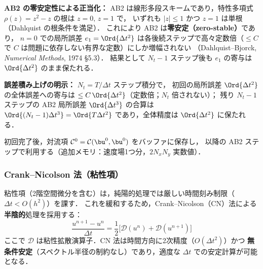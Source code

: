 \begin{tcolorbox}[warnbox, title={TVD-RK3 の適用範囲と全体時間精度}]
\noindent\textbf{AB2 の零安定性による正当化：}
AB2 は線形多段スキームであり，特性多項式 $\rho(z) = z^2 - z$ の根は $z=0,\,z=1$ で，
いずれも $|z| \leq 1$ かつ $z=1$ は単根（Dahlquist の根条件を満足）．
これにより AB2 は\textbf{零安定（zero-stable）}であり，
$n=0$ での局所誤差 $e_1 = \Ord{\Delta t^2}$ は各後続ステップで高々定数倍（$\leq C$ で $C$ は問題に依存しない有界な定数）にしか増幅されない
（Dahlquist--Bjorck, \textit{Numerical Methods}, 1974 §5.3）．
結果として $N_t - 1$ ステップ後も $e_1$ の寄与は $\Ord{\Delta t^2}$ のまま保たれる．

\noindent\textbf{誤差積み上げの明示：}
$N_t = T/\Delta t$ ステップ積分で，
初回の局所誤差 $\Ord{\Delta t^2}$ の全体誤差への寄与は $\leq C\,\Ord{\Delta t^2}$（定数倍；$N_t$ 倍されない）；
残り $N_t - 1$ ステップの AB2 局所誤差 $\Ord{\Delta t^3}$ の合算は
$\Ord{(N_t-1)\Delta t^3} = \Ord{T\Delta t^2}$
であり，全体精度は $\Ord{\Delta t^2}$ に保たれる．

初回完了後，対流項 $\mathcal{C}^0 = \mathcal{C}(\bu^0,\bu^0)$ をバッファに保存し，
以降の AB2 ステップで利用する（追加メモリ：速度場1つ分，$2N_xN_y$ 実数値）．
\end{tcolorbox}

\subsubsection{Crank--Nicolson 法（粘性項）}

粘性項（2階空間微分を含む）は，純陽的処理では厳しい時間刻み制限（$\Delta t < O(h^2)$）を課す．
これを緩和するため，Crank--Nicolson（CN）法による\textbf{半陰的}処理を採用する：
\begin{equation}
  \frac{u^{n+1} - u^n}{\Delta t} = \frac{1}{2}\bigl[\mathcal{D}(u^n) + \mathcal{D}(u^{n+1})\bigr]
  \label{eq:crank_nicolson}
\end{equation}
ここで $\mathcal{D}$ は粘性拡散演算子．CN 法は時間方向に2次精度（$O(\Delta t^2)$）かつ
\textbf{無条件安定}（スペクトル半径の制約なし）であり，適度な $\Delta t$ での安定計算が可能となる．

